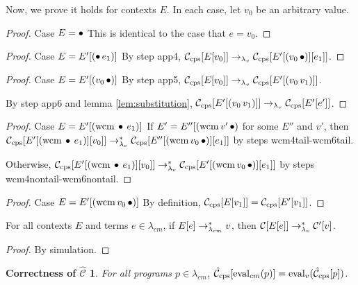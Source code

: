 Now, we prove it holds for contexts $E$. In each case, let $v_0$ be an arbitrary value.
\begin{proof}{Case $E=\bullet$}
This is identical to the case that $e=v_0$.
\end{proof}

\begin{proof}{Case $E=E'[(\bullet\,e_1)]$}
By step app4, $\mathcal{C}_{\mathrm{cps}}[E[v_0]]\rightarrow_{\lambda_v}\mathcal{C}_{\mathrm{cps}}[E'[(v_0\,\bullet)][e_1]]$.
\end{proof}

\begin{proof}{Case $E=E'[(v_0\,\bullet)]$}
By step app5, $\mathcal{C}_{\mathrm{cps}}[E[v_0]]\rightarrow_{\lambda_v}\mathcal{C}_{\mathrm{cps}}[E'[(v_0\,v_1)]]$.

By step app6 and lemma \ref{lem:substitution}, $\mathcal{C}_{\mathrm{cps}}[E'[(v_0\,v_1)]]\rightarrow_{\lambda_v}\mathcal{C}_{\mathrm{cps}}[E'[e']]$.
\end{proof}

\begin{proof}{Case $E=E'[(\mathrm{wcm}\,\bullet\,e_1)]$}
If $E'=E''[(\mathrm{wcm}\,v'\,\bullet)$ for some $E''$ and $v'$, then $\mathcal{C}_{\mathrm{cps}}[E'[(\mathrm{wcm}\,\bullet\,e_1)][v_0]]\rightarrow_{\lambda_v}^{*}\mathcal{C}_{\mathrm{cps}}[E''[(\mathrm{wcm}\,v_0\,\bullet)][e_1]]$ by steps wcm4tail-wcm6tail.

Otherwise, $\mathcal{C}_{\mathrm{cps}}[E'[(\mathrm{wcm}\,\bullet\,e_1)][v_0]]\rightarrow_{\lambda_v}^{*}\mathcal{C}_{\mathrm{cps}}[E'[(\mathrm{wcm}\,v_0\,\bullet)][e_1]]$ by steps wcm4nontail-wcm6nontail.
\end{proof}

\begin{proof}{Case $E=E'[(\mathrm{wcm}\,v_0\,\bullet)]$}
By definition, $\mathcal{C}_{\mathrm{cps}}[E[v_1]]=\mathcal{C}_{\mathrm{cps}}[E'[v_1]]$.
\end{proof}

\begin{lemma}
For all contexts $E$ and terms $e\in\lambda_{cm}$, if $E[e]\rightarrow_{\lambda_{cm}}^{*} v$, then $\mathcal{C}[E[e]]\rightarrow_{\lambda_v}^{*}\mathcal{C}'[v]$.
\end{lemma}

\begin{proof}
By simulation.
\end{proof}

\newtheorem*{maintheorem}{Correctness of $\hat{\mathcal{C}}$}
\begin{maintheorem}
For all programs $p\in\lambda_{cm}$, $\hat{\mathcal{C}}_{\mathrm{cps}}[\mathrm{eval}_{cm}(p)]=\mathrm{eval}_{v}(\hat{\mathcal{C}}_{\mathrm{cps}}[p])$.
\end{maintheorem}

